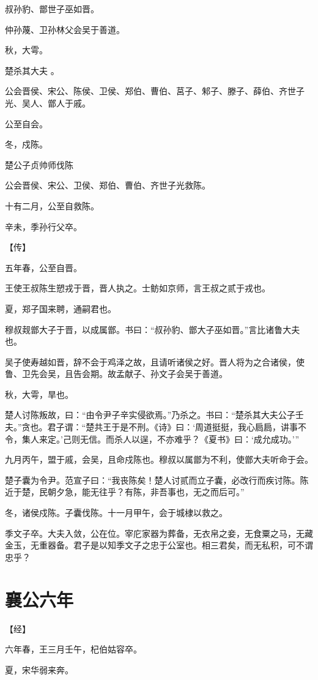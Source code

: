 \documentclass[a4paper,12pt,UTF8,twoside]{ctexbook}
\begin{document}
叔孙豹、鄫世子巫如晋。

仲孙蔑、卫孙林父会吴于善道。

秋，大雩。

楚杀其大夫 。

公会晋侯、宋公、陈侯、卫侯、郑伯、曹伯、莒子、邾子、滕子、薛伯、齐世子光、吴人、鄫人于戚。

公至自会。

冬，戍陈。

楚公子贞帅师伐陈

公会晋侯、宋公、卫侯、郑伯、曹伯、齐世子光救陈。

十有二月，公至自救陈。

辛未，季孙行父卒。

【传】

五年春，公至自晋。

王使王叔陈生愬戎于晋，晋人执之。士鲂如京师，言王叔之贰于戎也。

夏，郑子国来聘，通嗣君也。

穆叔觌鄫大子于晋，以成属鄫。书曰：“叔孙豹、鄫大子巫如晋。”言比诸鲁大夫也。

吴子使寿越如晋，辞不会于鸡泽之故，且请听诸侯之好。晋人将为之合诸侯，使鲁、卫先会吴，且告会期。故孟献子、孙文子会吴于善道。

秋，大雩，旱也。

楚人讨陈叛故，曰：“由令尹子辛实侵欲焉。”乃杀之。书曰：“楚杀其大夫公子壬夫。”贪也。君子谓：“楚共王于是不刑。《诗》曰：‘周道挺挺，我心扃扃，讲事不令，集人来定。’己则无信。而杀人以逞，不亦难乎？《夏书》曰：‘成允成功。’”

九月丙午，盟于戚，会吴，且命戍陈也。穆叔以属鄫为不利，使鄫大夫听命于会。

楚子囊为令尹。范宣子曰：“我丧陈矣！楚人讨贰而立子囊，必改行而疾讨陈。陈近于楚，民朝夕急，能无往乎？有陈，非吾事也，无之而后可。”

冬，诸侯戍陈。子囊伐陈。十一月甲午，会于城棣以救之。

季文子卒。大夫入敛，公在位。宰庀家器为葬备，无衣帛之妾，无食粟之马，无藏金玉，无重器备。君子是以知季文子之忠于公室也。相三君矣，而无私积，可不谓忠乎？


\section{襄公六年}



【经】

六年春，王三月壬午，杞伯姑容卒。

夏，宋华弱来奔。
\end{document}
